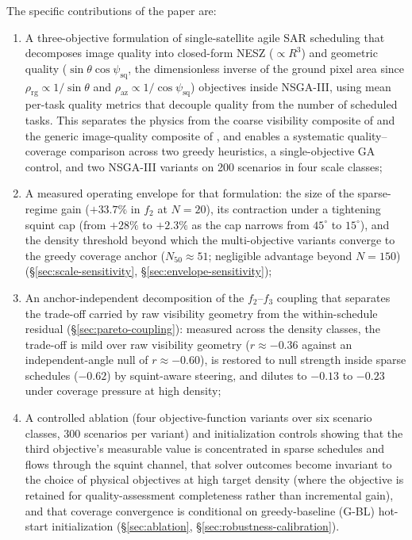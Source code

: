 \documentclass[preprint,12pt,authoryear]{elsarticle}
\begin{document}
The specific contributions of the paper are:
\begin{enumerate}[nosep]
    \item A three-objective formulation of single-satellite agile SAR
    scheduling that decomposes image quality into closed-form NESZ
    ($\propto R^3$) and geometric quality
    ($\sin\theta\cos\psi_{\text{sq}}$, the dimensionless inverse of the ground
    pixel area since $\rho_{\text{rg}} \propto 1/\sin\theta$ and
    $\rho_{\text{az}} \propto 1/\cos\psi_{\text{sq}}$) objectives inside
    NSGA-III, using mean per-task quality metrics that decouple quality from
    the number of scheduled tasks. This separates the physics from the coarse
    visibility composite of \citet{Kramer2025SARVis} and the generic
    image-quality composite of \citet{Wei2025MONP}, and enables a systematic
    quality--coverage comparison across two greedy heuristics, a
    single-objective GA control, and two NSGA-III variants on 200 scenarios in
    four scale classes;
    \item A measured operating envelope for that formulation: the size of the
    sparse-regime gain ($+33.7\%$ in $f_2$ at $N=20$), its contraction under a
    tightening squint cap (from $+28\%$ to $+2.3\%$ as the cap narrows from
    $45^\circ$ to $15^\circ$), and the density threshold beyond which the
    multi-objective variants converge to the greedy coverage anchor
    ($N_{50} \approx 51$; negligible advantage beyond $N=150$)
    (\S\ref{sec:scale-sensitivity}, \S\ref{sec:envelope-sensitivity});
    \item An anchor-independent decomposition of the $f_2$--$f_3$ coupling
    that separates the trade-off carried by raw visibility geometry from the
    within-schedule residual (\S\ref{sec:pareto-coupling}): measured across
    the density classes, the trade-off is mild over raw visibility geometry
    ($r \approx -0.36$ against an independent-angle null of $r \approx -0.60$),
    is restored to null strength inside sparse schedules ($-0.62$) by
    squint-aware steering, and dilutes to $-0.13$ to $-0.23$ under coverage
    pressure at high density;
    \item A controlled ablation (four objective-function variants over six
    scenario classes, 300 scenarios per variant) and initialization controls
    showing that the third objective's measurable value is concentrated in
    sparse schedules and flows through the squint channel, that solver
    outcomes become invariant to the choice of physical objectives at high
    target density (where the objective is retained for quality-assessment
    completeness rather than incremental gain), and that coverage convergence
    is conditional on greedy-baseline (G-BL) hot-start initialization
    (\S\ref{sec:ablation}, \S\ref{sec:robustness-calibration}).
\end{enumerate}
\end{document}
